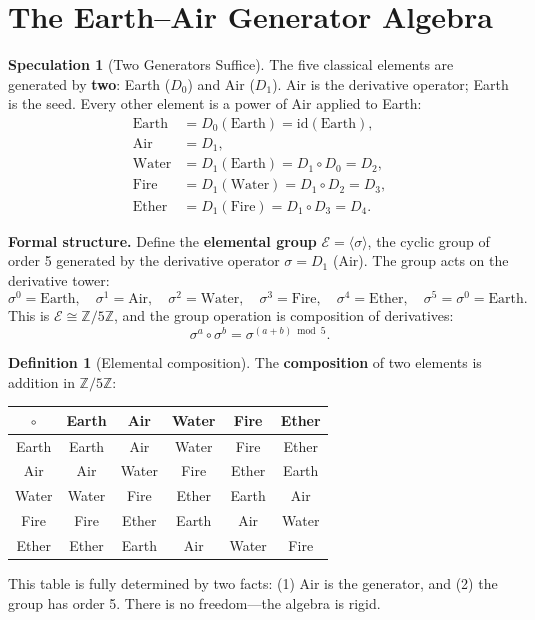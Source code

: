 \documentclass[11pt]{article}
\theoremstyle{definition}
\newtheorem{definition}[theorem]{Definition}
\newtheorem{speculation}[theorem]{Speculation}
\theoremstyle{remark}
\begin{document}
\section{The Earth--Air Generator Algebra}
\label{sec:earth-air}

\begin{speculation}[Two Generators Suffice]
\label{spec:two-gen}
The five classical elements are generated by \textbf{two}: Earth ($D_0$) and
Air ($D_1$).  Air is the derivative operator; Earth is the seed.  Every other
element is a power of Air applied to Earth:
\begin{align}
  \text{Earth} &= D_0(\text{Earth}) = \text{id}(\text{Earth}), \\
  \text{Air}   &= D_1, \\
  \text{Water} &= D_1(\text{Earth}) = D_1 \circ D_0 = D_2, \\
  \text{Fire}  &= D_1(\text{Water}) = D_1 \circ D_2 = D_3, \\
  \text{Ether} &= D_1(\text{Fire})  = D_1 \circ D_3 = D_4.
\end{align}
\end{speculation}

\textbf{Formal structure.}
Define the \textbf{elemental group} $\mathcal{E} = \langle \sigma \rangle$,
the cyclic group of order 5 generated by the derivative operator
$\sigma = D_1$ (Air).  The group acts on the derivative tower:
\[
  \sigma^0 = \text{Earth}, \quad
  \sigma^1 = \text{Air}, \quad
  \sigma^2 = \text{Water}, \quad
  \sigma^3 = \text{Fire}, \quad
  \sigma^4 = \text{Ether}, \quad
  \sigma^5 = \sigma^0 = \text{Earth}.
\]
This is $\mathcal{E} \cong \mathbb{Z}/5\mathbb{Z}$, and the group operation
is composition of derivatives:
\[
  \sigma^a \circ \sigma^b = \sigma^{(a+b) \bmod 5}.
\]

\begin{definition}[Elemental composition]
\label{def:elem-compose}
The \textbf{composition} of two elements is addition in $\mathbb{Z}/5\mathbb{Z}$:
\begin{center}
\begin{tabular}{c|ccccc}
$\circ$ & Earth & Air & Water & Fire & Ether \\
\hline
Earth & Earth & Air & Water & Fire & Ether \\
Air & Air & Water & Fire & Ether & Earth \\
Water & Water & Fire & Ether & Earth & Air \\
Fire & Fire & Ether & Earth & Air & Water \\
Ether & Ether & Earth & Air & Water & Fire \\
\end{tabular}
\end{center}
This table is fully determined by two facts: (1) Air is the generator, and
(2) the group has order 5.  There is no freedom---the algebra is rigid.
\end{definition}
\end{document}
